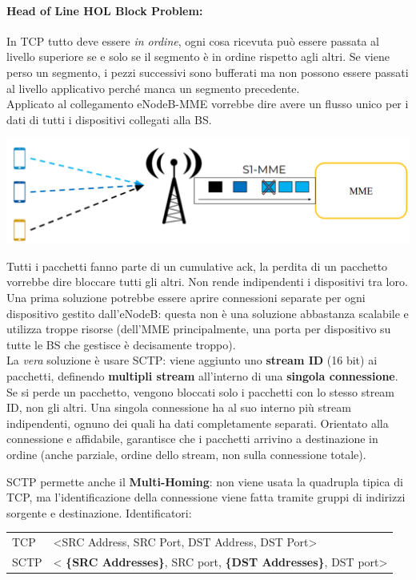 \newpage

\paragraph{Head of Line HOL Block Problem:} In TCP tutto deve essere \textit{in ordine}, ogni cosa ricevuta  può essere passata al livello superiore se e solo se il segmento è in ordine rispetto agli altri. Se viene perso un segmento, i pezzi successivi sono bufferati ma non possono essere passati al livello applicativo perché manca un segmento precedente.\\

Applicato al collegamento eNodeB-MME vorrebbe dire avere un flusso unico per i dati di tutti i dispositivi collegati alla BS. 
\begin{center}
	\includegraphics[width=0.7\linewidth]{img/4g/holprob1}
\end{center}

Tutti i pacchetti fanno parte di un cumulative ack, la perdita di un pacchetto vorrebbe dire bloccare tutti gli altri. Non rende indipendenti i dispositivi tra loro.\\

Una prima soluzione potrebbe essere aprire connessioni separate per ogni dispositivo gestito dall'eNodeB: questa non è una soluzione abbastanza scalabile e utilizza troppe risorse (dell'MME principalmente, una porta per dispositivo su tutte le BS che gestisce è decisamente troppo).\\

La \textit{vera} soluzione è usare SCTP: viene aggiunto uno \textbf{stream ID} (16 bit) ai pacchetti, definendo \textbf{multipli stream} all'interno di una \textbf{singola connessione}. Se si perde un pacchetto, vengono bloccati solo i pacchetti con lo stesso stream ID, non gli altri. Una singola connessione ha al suo interno più stream indipendenti, ognuno dei quali ha dati completamente separati. Orientato alla connessione e affidabile, garantisce che i pacchetti arrivino a destinazione in ordine (anche parziale, ordine dello stream, non sulla connessione totale).\\

\newpage

SCTP permette anche il \textbf{Multi-Homing}: non viene usata la quadrupla tipica di TCP, ma l'identificazione della connessione viene fatta tramite gruppi di indirizzi sorgente e destinazione. Identificatori: 
\begin{center}
	\begin{tabular}{l l}
		TCP & <SRC Address, SRC Port, DST Address, DST Port> \\
		SCTP & < \textbf{\{SRC Addresses\}}, SRC port, \textbf{\{DST Addresses\}}, DST port>
	\end{tabular}
\end{center}

